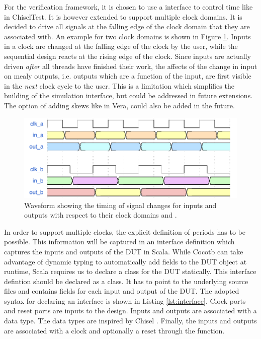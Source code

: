 For the verification framework, it is chosen to use a  interface to control time like in ChiselTest. It is
however extended to support multiple clock domains. It is decided to drive all signals at the falling edge of the
clock domain that they are associated with. An example for two clock domains is shown in Figure \ref{fig:wavedrom}. Inputs in a clock are changed at the falling edge of the clock by the user, while the sequential design reacts at the rising edge of the clock. Since inputs are actually driven \textit{after} all threads have finished their work, the affects of the change in input on mealy outputs, i.e. outputs which are a function of the input, are first visible in the \textit{next} clock cycle to the user. This is a limitation which simplifies the building of the simulation interface, but could be addressed in future extensions. The option of adding skews like in Vera, could also be added in the future. 
\begin{figure}
\centering
\includegraphics[width=\textwidth]{diagrams/wavedrom.pdf}
\caption{Waveform showing the timing of signal changes for inputs and outputs with respect to their clock domains  and .}
\label{fig:wavedrom}
\end{figure}

In order to support multiple clocks, the explicit definition of periods has to be possible. This information will be captured in an interface definition which captures the inputs and outputs of the DUT in
Scala. While Cocotb can take advantage of dynamic typing to automatically add fields to the DUT object at runtime,
Scala requires us to declare a class for the DUT statically. This interface defintion should be declared as a class.
It has to point to the underlying source files and contains fields for each input and output of the DUT. The adopted
syntax for declaring an interface is shown in Listing \ref{lst:interface}. Clock ports and reset ports are inputs to
the design. Inputs and outputs are associated with a data type. The data types are inspired by Chisel
\cite{chiselpaper}. Finally, the inputs and outputs are associated with a clock and optionally a reset through the
 function.


